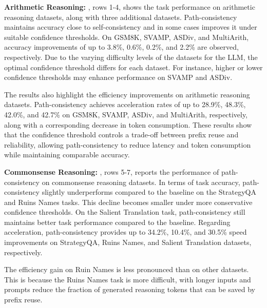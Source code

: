 \textbf{Arithmetic Reasoning:}
, rows 1-4, shows the task performance on arithmetic reasoning datasets, along with three additional datasets. Path-consistency maintains accuracy close to self-consistency and in some cases improves it under suitable confidence thresholds. On GSM8K, SVAMP, ASDiv, and MultiArith, accuracy improvements of up to 3.8\%, 0.6\%, 0.2\%, and 2.2\% are observed, respectively. Due to the varying difficulty levels of the datasets for the LLM, the optimal confidence threshold differs for each dataset. For instance, higher or lower confidence thresholds may enhance performance on SVAMP and ASDiv.

The results also highlight the efficiency improvements on arithmetic reasoning datasets. Path-consistency achieves acceleration rates of up to 28.9\%, 48.3\%, 42.0\%, and 42.7\% on GSM8K, SVAMP, ASDiv, and MultiArith, respectively, along with a corresponding decrease in token consumption. These results show that the confidence threshold controls a trade-off between prefix reuse and reliability, allowing path-consistency to reduce latency and token consumption while maintaining comparable accuracy.

\textbf{Commonsense Reasoning:}
, rows 5-7, reports the performance of path-consistency on commonsense reasoning datasets. In terms of task accuracy, path-consistency slightly underperforms compared to the baseline on the StrategyQA and Ruins Names tasks. This decline becomes smaller under more conservative confidence thresholds. On the Salient Translation task, path-consistency still maintains better task performance compared to the baseline. Regarding acceleration, path-consistency provides up to 34.2\%, 10.4\%, and 30.5\% speed improvements on StrategyQA, Ruins Names, and Salient Translation datasets, respectively.

The efficiency gain on Ruin Names is less pronounced than on other datasets. This is because the Ruins Names task is more difficult, with longer inputs and prompts reduce the fraction of generated reasoning tokens that can be saved by prefix reuse.

